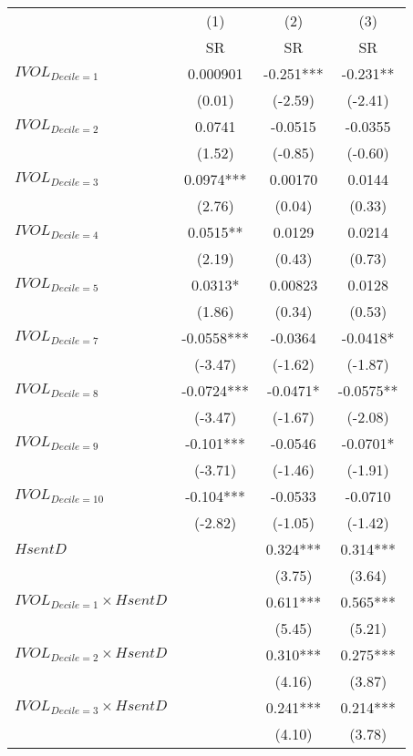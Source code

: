 \begin{tabular}{lccc}
\toprule
        & (1)     & (2)     & (3) \\
        & SR      & SR      & SR \\
\midrule
$IVOL_{Decile = 1} $ & 0.000901 & -0.251*** & -0.231** \\
        & (0.01)  & (-2.59) & (-2.41) \\
$IVOL_{Decile = 2} $ & 0.0741  & -0.0515 & -0.0355 \\
        & (1.52)  & (-0.85) & (-0.60) \\
$IVOL_{Decile = 3} $ & 0.0974*** & 0.00170 & 0.0144 \\
        & (2.76)  & (0.04)  & (0.33) \\
$IVOL_{Decile = 4} $ & 0.0515** & 0.0129  & 0.0214 \\
        & (2.19)  & (0.43)  & (0.73) \\
$IVOL_{Decile = 5} $ & 0.0313* & 0.00823 & 0.0128 \\
        & (1.86)  & (0.34)  & (0.53) \\
$IVOL_{Decile = 7} $ & -0.0558*** & -0.0364 & -0.0418* \\
        & (-3.47) & (-1.62) & (-1.87) \\
$IVOL_{Decile = 8} $ & -0.0724*** & -0.0471* & -0.0575** \\
        & (-3.47) & (-1.67) & (-2.08) \\
$IVOL_{Decile = 9} $ & -0.101*** & -0.0546 & -0.0701* \\
        & (-3.71) & (-1.46) & (-1.91) \\
$IVOL_{Decile = 10} $ & -0.104*** & -0.0533 & -0.0710 \\
        & (-2.82) & (-1.05) & (-1.42) \\
$HsentD$ &         & 0.324*** & 0.314*** \\
        &         & (3.75)  & (3.64) \\
$IVOL_{Decile = 1} \times HsentD$ &         & 0.611*** & 0.565*** \\
        &         & (5.45)  & (5.21) \\
$IVOL_{Decile = 2} \times HsentD$ &         & 0.310*** & 0.275*** \\
        &         & (4.16)  & (3.87) \\
$IVOL_{Decile = 3} \times HsentD$ &         & 0.241*** & 0.214*** \\
        &         & (4.10)  & (3.78) \\

\end{tabular}
